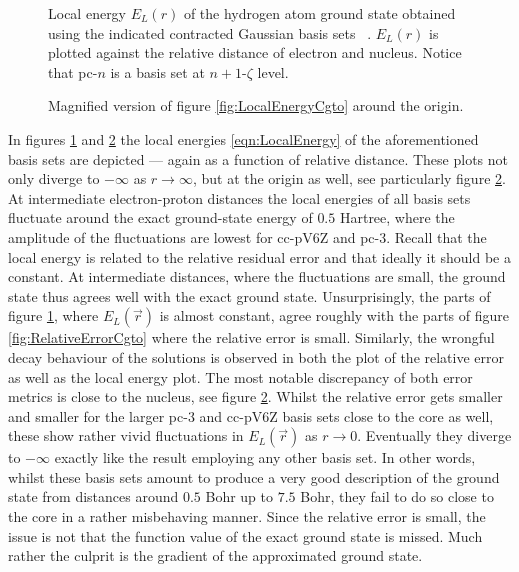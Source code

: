 \begin{figure}[p]
	\centering
	\caption[Local energy of the hydrogen ground state for {\cGTO} bases]{
		Local energy $E_L(r)$ of the hydrogen atom ground state
		obtained using the indicated contracted Gaussian basis sets~%
		\cite{Hehre1969,Dunning1989,Jensen2001,Wilson1996}.
		$E_L(r)$ is plotted against the relative distance
		of electron and nucleus.
		Notice that pc-$n$ is a basis set at $n+1$-$\zeta$ level.
	}
	\label{fig:LocalEnergyCgto}
\end{figure}

\begin{figure}[p]
	\centering
	\caption[Local energy of the hydrogen ground state for {\cGTO} bases (magnified)]{
		Magnified version of figure \vref{fig:LocalEnergyCgto}
		around the origin.
	}
	\label{fig:LocalEnergyCgtoZoom}
\end{figure}

In figures \ref{fig:LocalEnergyCgto} and \ref{fig:LocalEnergyCgtoZoom}
the local energies \eqref{eqn:LocalEnergy}
of the aforementioned basis sets are depicted
--- again as a function of relative distance.
These plots not only diverge to $-\infty$ as $r \to \infty$,
but at the origin as well, see particularly figure \ref{fig:LocalEnergyCgtoZoom}.
At intermediate electron-proton distances
the local energies of all basis sets
fluctuate around the exact ground-state energy of $0.5$ Hartree,
where the amplitude of the fluctuations are lowest for cc-pV6Z and pc-3.
Recall that the local energy is related to the relative residual error
and that ideally it should be a constant.
At intermediate distances, where the fluctuations are small,
the ground state thus agrees well with the exact ground state.
Unsurprisingly, the parts of figure \ref{fig:LocalEnergyCgto},
where $E_L(\vec{r})$ is almost constant,
agree roughly with the parts of figure \ref{fig:RelativeErrorCgto}
where the relative error is small.
Similarly, the wrongful decay behaviour of the \cGTO solutions
is observed in both the plot of the relative error as well as
the local energy plot.
The most notable discrepancy of both error metrics
is close to the nucleus, see figure \ref{fig:LocalEnergyCgtoZoom}.
Whilst the relative error gets smaller and smaller for the larger
pc-3 and cc-pV6Z basis sets close to the core as well,
these show rather vivid fluctuations in $E_L(\vec{r})$ as $r \to 0$.
Eventually they diverge to $-\infty$ exactly like the result
employing any other basis set.
In other words, whilst these basis sets amount to produce
a very good description of the ground state from distances around
$0.5$ Bohr up to $7.5$ Bohr,
they fail to do so close to the core in a rather misbehaving manner.
Since the relative error is small,
the issue is not that the function value
of the exact ground state is missed.
Much rather the culprit is the gradient of the approximated
ground state.

